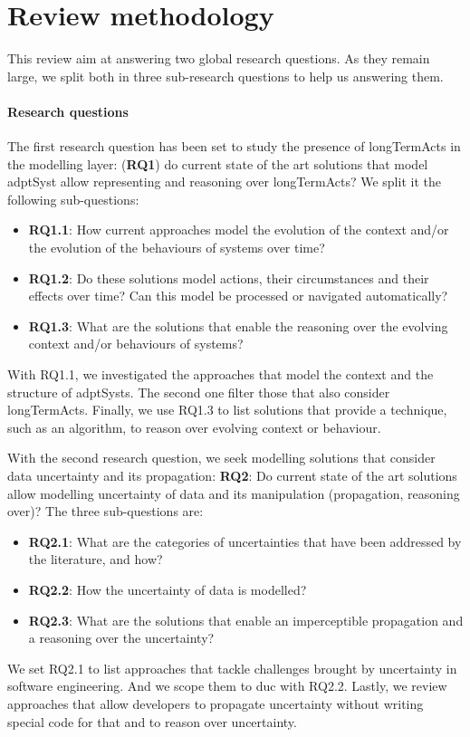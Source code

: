 \section{Review methodology}
\label{sec:sota:methodo}

This review aim at answering two global research questions.
As they remain large, we split both in three sub-research questions to help us answering them.

\paragraph{Research questions}
The first research question has been set to study the presence of \glspl{longTermAct} in the modelling layer: (\textbf{RQ1}) do current state of the art solutions that model \gls{adptSyst} allow representing and reasoning over \glspl{longTermAct}?
We split it the following sub-questions:
\begin{itemize}
	\item \textbf{RQ1.1}: How current approaches model the evolution of the context and/or the evolution of the behaviours of systems over time?
	\item \textbf{RQ1.2}: Do these solutions model actions, their circumstances and their effects over time? Can this model be processed or navigated automatically?
	\item \textbf{RQ1.3}: What are the solutions that enable the reasoning over the evolving context and/or behaviours of systems?
\end{itemize}
With RQ1.1, we investigated the approaches that model the context and the structure of \glspl{adptSyst}.
The second one filter those that also consider \glspl{longTermAct}.
Finally, we use RQ1.3 to list solutions that provide a technique, such as an algorithm, to reason over evolving context or behaviour.

With the second research question, we seek modelling solutions that consider data uncertainty and its propagation: \textbf{RQ2}: Do current state of the art solutions allow modelling uncertainty of data and its manipulation (propagation, reasoning over)?
The three sub-questions are:
\begin{itemize}
	\item \textbf{RQ2.1}: What are the categories of uncertainties that have been addressed by the literature, and how?
	\item \textbf{RQ2.2}: How the uncertainty of data is modelled?
	\item \textbf{RQ2.3}: What are the solutions that enable an imperceptible propagation and a reasoning over the uncertainty?
\end{itemize}
We set RQ2.1 to list approaches that tackle challenges brought by uncertainty in software engineering.
And we scope them to \gls{duc} with RQ2.2.
Lastly, we review approaches that allow developers to propagate uncertainty without writing special code for that and to reason over uncertainty.

